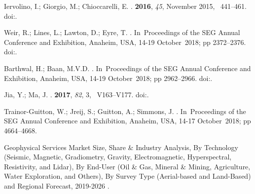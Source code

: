 \documentclass[geosciences,article,submit,moreauthors,pdftex]{Definitions/mdpi}
\begin{document}
\begin{thebibliography}{999}
Iervolino, I.; Giorgio, M.; Chioccarelli, E.
.
 {\bf 2016}, {\em 45}, {November 2015}, ~441--461.
\newblock
 doi:{\href{ https://doi.org/10.1002/eqe}{}}.

Weir, R.; Lines, L.; Lawton, D.; Eyre, T.
.
\newblock In~Proceedings of the SEG Annual Conference and Exhibition, Anaheim, USA, 14-19 October~2018; pp 2372--2376.
doi:{\href{ https://doi.org/10.1190/segam2018-2980345.1}{}}.


Barthwal, H.; Baan, M.V.D.
.
\newblock In~Proceedings of the SEG Annual Conference and Exhibition, Anaheim, USA, 14-19 October~2018; pp 2962--2966.
doi:{\href{ https://doi.org/10.1190/segam2018-2980345.1}{}}.


Jia, Y.; Ma, J.
.
 {\bf 2017}, {\em 82}, {3}, ~V163--V177.
 doi:{\href{https://doi.org/10.1190/geo2016-0300.1}{}}.



Trainor-Guitton, W.; Jreij, S.; Guitton, A.; Simmons, J. 
.
\newblock In~Proceedings of the SEG Annual Conference and Exhibition, Anaheim, USA, 14-17 October~2018; pp 4664--4668.


Geophysical Services Market Size, Share \& Industry Analysis, By Technology (Seismic, Magnetic, Gradiometry, Gravity, Electromagnetic, Hyperspectral, Resistivity, and Lidar), By End-User (Oil \& Gas, Mineral \& Mining, Agriculture, Water Exploration, and Others), By Survey Type (Aerial-based and Land-Based) and Regional Forecast, 2019-2026
.


\end{thebibliography}
\end{document}
